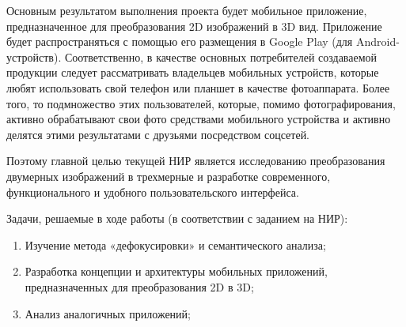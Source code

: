 
Основным результатом выполнения проекта будет мобильное приложение, предназначенное для преобразования 2D изображений в 3D вид. Приложение будет распространяться с помощью его размещения в Google Play (для Android-устройств). Соответственно, в качестве основных потребителей создаваемой продукции следует рассматривать владельцев мобильных устройств, которые любят использовать свой телефон или планшет в качестве фотоаппарата. Более того, то подмножество этих пользователей, которые, помимо фотографирования, активно обрабатывают свои фото средствами мобильного устройства и активно делятся этими результатами с друзьями посредством соцсетей.

Поэтому главной целью текущей НИР является исследованию	преобразования двумерных изображений в трехмерные и разработке современного, функционального и удобного пользовательского интерфейса. 

Задачи, решаемые в ходе работы (в соответствии с заданием на НИР):
\begin{enumerate}
    \item Изучение метода «дефокусировки» и семантического анализа;
    \item Разработка концепции и архитектуры мобильных приложений, предназначенных для преобразования 2D в 3D;
    \item Анализ аналогичных приложений;
\end{enumerate}
